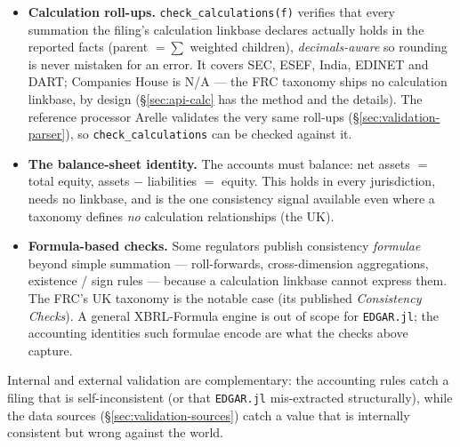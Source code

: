 \documentclass[11pt,a4paper]{report}
\begin{document}
\begin{itemize}[nosep]
  \item \textbf{Calculation roll-ups.} \texttt{check\_calculations(f)} verifies that every summation the
    filing's calculation linkbase declares actually holds in the reported facts (parent $=\sum$ weighted
    children), \emph{decimals-aware} so rounding is never mistaken for an error. It covers SEC, ESEF, India,
    EDINET and DART; Companies House is N/A --- the FRC taxonomy ships no calculation linkbase, by design
    (\S\ref{sec:api-calc} has the method and the details). The reference processor Arelle validates the very
    same roll-ups (\S\ref{sec:validation-parser}), so \texttt{check\_calculations} can be checked against it.
  \item \textbf{The balance-sheet identity.} The accounts must balance: net assets $=$ total equity, assets
    $-$ liabilities $=$ equity. This holds in every jurisdiction, needs no linkbase, and is the one
    consistency signal available even where a taxonomy defines \emph{no} calculation relationships (the UK).
  \item \textbf{Formula-based checks.} Some regulators publish consistency \emph{formulae} beyond simple
    summation --- roll-forwards, cross-dimension aggregations, existence / sign rules --- because a
    calculation linkbase cannot express them. The FRC's UK taxonomy is the notable case (its published
    \emph{Consistency Checks}). A general XBRL-Formula engine is out of scope for \texttt{EDGAR.jl}; the
    accounting identities such formulae encode are what the checks above capture.
\end{itemize}

\noindent Internal and external validation are complementary: the accounting rules catch a filing that is
self-inconsistent (or that \texttt{EDGAR.jl} mis-extracted structurally), while the data sources
(\S\ref{sec:validation-sources}) catch a value that is internally consistent but wrong against the world.
\end{document}
